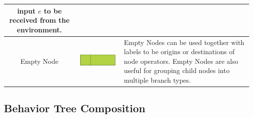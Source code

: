 \documentclass[]{article}
\begin{document}
\begin{tabularx}{\textwidth}{|c|c|X|}
input $e$ to be received from the environment.\\ \hline
Empty Node&\includegraphics{figs/AppendixB/BasicNodes/Empty} & Empty Nodes can be used together with labels to be origins or destinations of node operators. Empty Nodes are also useful for grouping child nodes into multiple branch types.
\end{tabularx}

\subsection{Behavior Tree Composition}
\end{document}
